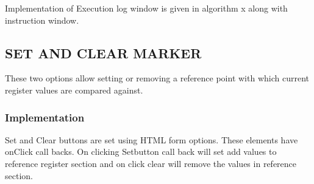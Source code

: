 Implementation of Execution log window is given in algorithm x along with instruction window.

\subsection{SET AND CLEAR MARKER}
These two options allow setting or removing a reference point with which current register values are compared against.

\subsubsection{Implementation}

Set and Clear buttons are set using HTML form options. These elements have onClick call backs. On clicking Setbutton call back will set add values to reference register section and on click clear will remove the values in reference section.



